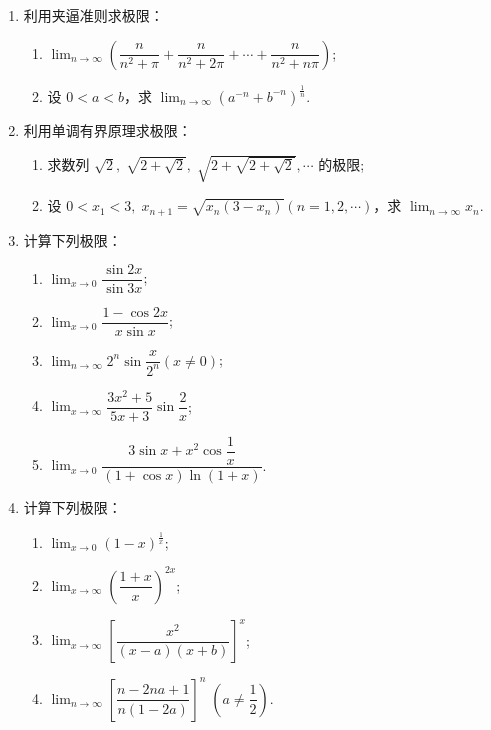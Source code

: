 \begin{enumerate}\setlength{\itemsep}{7pt}
    
    \item 利用夹逼准则求极限：
    \begin{enumerate}[(1)]\setlength{\itemsep}{5pt}\setlength{\topsep}{15pt}
        \item $\displaystyle\lim_{n\to\infty}\left(\dfrac{n}{n^2+\pi}+\dfrac{n}{n^2+2\pi}+\cdots+\dfrac{n}{n^2+n\pi}\right)$;
        \item 设 $0<a<b$，求 $\displaystyle\lim_{n\to\infty}(a^{-n}+b^{-n})^{\frac{1}{n}}$.
    \end{enumerate}

    \item 利用单调有界原理求极限：
    \begin{enumerate}[(1)]\setlength{\itemsep}{5pt}\setlength{\topsep}{15pt}
        \item 求数列 $\sqrt{2},\;\sqrt{2+\sqrt{2}},\;\sqrt{2+\sqrt{2+\sqrt{2}}},\cdots$ 的极限;
        \item 设 $0<x_1<3,\;x_{n+1}=\sqrt{x_n(3-x_n)}(n=1,2,\cdots)$，求 $\displaystyle\lim_{n\to\infty}x_n$.
    \end{enumerate}

    \item 计算下列极限：
    \begin{enumerate}[(1)]\setlength{\itemsep}{5pt}\setlength{\topsep}{15pt}
        \item $\displaystyle\lim_{x\to0}\dfrac{\sin 2x}{\sin 3x}$;
        \item $\displaystyle\lim_{x\to0}\dfrac{1-\cos 2x}{x\sin x}$;
        \item $\displaystyle\lim_{n\to\infty}2^n\sin\dfrac{x}{2^n}(x\not=0)$;
        \item $\displaystyle\lim_{x\to\infty}\dfrac{3x^2+5}{5x+3}\sin\dfrac{2}{x}$;
        \item $\displaystyle\lim_{x\to0}\dfrac{3\sin x+x^2\cos\dfrac{1}{x}}{(1+\cos x)\ln(1+x)}$.
    \end{enumerate}

    \item 计算下列极限：
    \begin{enumerate}[(1)]\setlength{\itemsep}{5pt}\setlength{\topsep}{15pt}
        \item $\displaystyle\lim_{x\to0}(1-x)^{\frac{1}{x}}$;
        \item $\displaystyle\lim_{x\to\infty}\left(\dfrac{1+x}{x}\right)^{2x}$;
        \item $\displaystyle\lim_{x\to\infty}\left[\dfrac{x^2}{(x-a)(x+b)}\right]^x$;
        \item $\displaystyle\lim_{n\to\infty}\left[\dfrac{n-2na+1}{n(1-2a)}\right]^n\;\left(a\not=\dfrac{1}{2}\right)$.
    \end{enumerate}


\end{enumerate}
